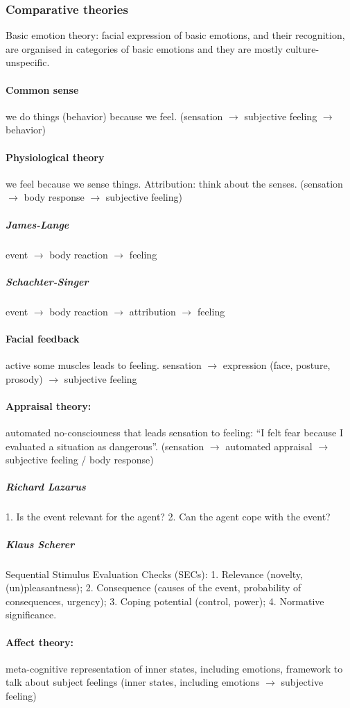 \documentclass[12pt,article,oneside,a4paper]{memoir}
\begin{document}
\subsubsection{Comparative theories}
Basic emotion theory: facial expression of basic emotions, and their recognition, are organised in categories of basic emotions and they are mostly culture-unspecific.

\paragraph{Common sense} we do things (behavior) because we feel. (sensation $\rightarrow$ subjective feeling $\rightarrow$ behavior)
\paragraph{Physiological theory} we feel because we sense things. Attribution: think about the senses. (sensation $\rightarrow$ body response $\rightarrow$ subjective feeling)
\subparagraph{James-Lange} event $\rightarrow$ body reaction $\rightarrow$ feeling
\subparagraph{Schachter-Singer} event $\rightarrow$ body reaction $\rightarrow$ attribution $\rightarrow$ feeling
\paragraph{Facial feedback} active some muscles leads to feeling. sensation $\rightarrow$ expression (face, posture, prosody) $\rightarrow$ subjective feeling
\paragraph{Appraisal theory:} automated no-consciouness that leads sensation to feeling: ``I felt fear because I evaluated a situation as dangerous''. (sensation $\rightarrow$ automated appraisal $\rightarrow$ subjective feeling / body response)
\subparagraph{Richard Lazarus} 1. Is the event relevant for the agent? 2. Can the agent cope with the event?
\subparagraph{Klaus Scherer} Sequential Stimulus Evaluation Checks (SECs): 1. Relevance (novelty, (un)pleasantness); 2. Consequence (causes of the event, probability of consequences, urgency); 3. Coping potential (control, power); 4. Normative significance.
\paragraph{Affect theory:} meta-cognitive representation of inner states, including emotions, framework to talk about subject feelings (inner states, including emotions $\rightarrow$ subjective feeling)
\end{document}
